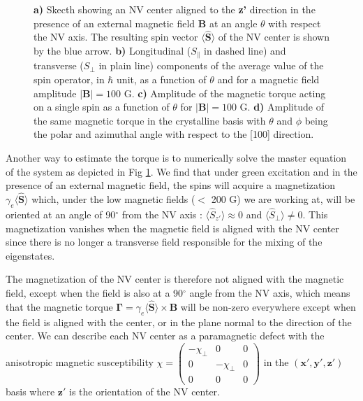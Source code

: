 \documentclass[preprintnumbers,amsmath,amssymb,onecolumn,12pt]{revtex4}
\begin{document}
\begin{figure}[ht]
  \caption{\textbf{a)} Skecth showing an NV center aligned to the \textbf{z'} direction in the presence of an external magnetic field \textbf{B} at an angle $\theta$ with respect the NV axis. The resulting spin vector $\langle \mathbf{ \hat S} \rangle$ of the NV center is shown by the blue arrow.
   \textbf{b)} Longitudinal ($S_\parallel$ in dashed line) and transverse ($S_\perp$ in plain line) components of the average value of the spin operator, in $\hbar$ unit, as a function of $\theta$ and for a magnetic field amplitude $|\mathbf{B}|=100$ G.   
   \textbf{c)} Amplitude of the magnetic torque acting on a single spin as a function of $\theta$ for $|\mathbf{B}|=100$ G.
   \textbf{d)} Amplitude of the same magnetic torque in the crystalline basis with $\theta$ and $\phi$ being the polar and azimuthal angle with respect to the [100] direction.}
  		\label{Torque1classe}
\end{figure}


Another way to estimate the torque is to numerically solve the master equation of the system as depicted in Fig \ref{Torque1classe}. We find that under green excitation and in the presence of an external magnetic field, the spins will acquire a magnetization $\gamma_e \langle\hat{\mathbf S}\rangle$ which, under the low magnetic fields ($<$ 200 G) we are working at, will be oriented at an angle of 90$^\circ$ from the NV axis : $\langle \hat S_{z'} \rangle \approx 0$ and $\langle \hat S_\perp \rangle \neq 0$. This magnetization vanishes when the magnetic field is aligned with the NV center since there is no longer a transverse field responsible for the mixing of the eigenstates. 

The magnetization of the NV center is therefore not aligned with the magnetic field, except when the field is also at a 90$^\circ$ angle from the NV axis, which means that the magnetic torque $\mathbf \Gamma = \gamma_e \langle\hat{\mathbf S}\rangle \times \mathbf B $ will be non-zero everywhere except when the field is aligned with the center, or in the plane normal to the direction of the center. We can describe each NV center as a paramagnetic defect with the anisotropic magnetic susceptibility $\chi = \begin{pmatrix}-\chi_\perp & 0 & 0\\ 0 & -\chi_\perp & 0 \\ 0 & 0 & 0  \end{pmatrix}$ in the $(\mathbf{x'},\mathbf{y'},\mathbf{z'})$ basis where $\mathbf{z'}$ is the orientation of the NV center.
\end{document}
